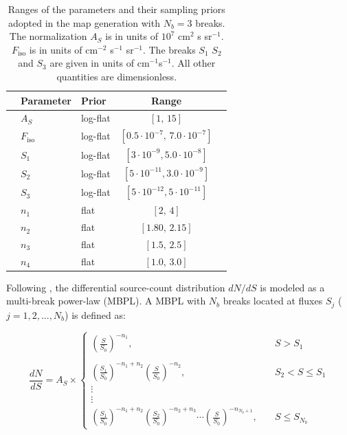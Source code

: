 \documentclass[a4paper,11pt]{article}
\newcommand{\dnds}{dN/dS }
\begin{document}
\begin{table}[t]
\centering
\begin{tabular}{lllcc}
\hline
 & Parameter & Prior & Range \\
\hline & $A_{S}$ & log-flat & {$[1,\, 15]$} \\
& $F_\textrm{iso}$ & log-flat & {$[0.5 \cdot 10^{-7},\, 7.0 \cdot 10^{-7}]$} \\
\hline &
$S_{1}$ & log-flat & {$[3 \cdot 10^{-9}, 5.0 \cdot 10^{-8}]$ } \\
& $S_{2}$ & log-flat & {$[5 \cdot 10^{-11}, 3.0 \cdot 10^{-9}]$} \\ 
& $S_{3}$ & log-flat & {$[5\cdot 10^{-12},5\cdot 10^{-11}]$} \\
& $n_{1}$ & flat & {$[2,\, 4]$} & \\
& $n_{2}$ & flat & {$[1.80,\, 2.15]$} & \\
& $n_{3}$ & flat & {$[1.5,\, 2.5]$} & \\
& $n_{4}$ & flat & {$[1.0,\, 3.0]$} & \\
\hline 
\end{tabular}
\caption{Ranges of the parameters and their sampling priors adopted in the map generation with $N_b = 3$ breaks. The normalization $A_S$ is in units of $10^7$ cm$^2$ s sr$^{-1}$. $F_\textrm{iso}$ is in units of cm$^{-2}$ s$^{-1}$ sr$^{-1}$. The breaks $S_{1}$ $S_{2}$ and $S_{3}$ are given in units of cm$^{-1}$s$^{-1}$. All other quantities are dimensionless.}
\label{tab:prior-dNdS}
\end{table}

Following \cite{Cuoco-1pdf}, the differential source-count distribution $\dnds$ is modeled as a multi-break power-law (MBPL). A MBPL with $N_b$ breaks located at fluxes $S_{j}$ ($j = 1, 2, ..., N_b$) is defined as:


\begin{equation}
\frac{d N}{d S} = A_S \times \left\{\begin{array}{lr}
\left(\frac{S}{S_{0}}\right)^{-n_{1}}, & \quad S>S_{1} \\ \\
\left(\frac{S_{1}}{S_{0}}\right)^{-n_{1}+n_{2}}\left(\frac{S}{S_{0}}\right)^{-n_{2}}, &\quad S_{2}<S \leqslant S_{1} \\ 
\vdots\\\vdots \\
\left(\frac{S_{1}}{S_{0}}\right)^{-n_{1}+n_{2}}\left(\frac{S_{2}}{S_{0}}\right)^{-n_{2}+n_{3}} \cdots\left(\frac{S}{S_{0}}\right)^{-n_{N_{b}+1}}, &\quad S \leqslant S_{N_{b}}
\end{array}\right.
\end{equation}
\end{document}
